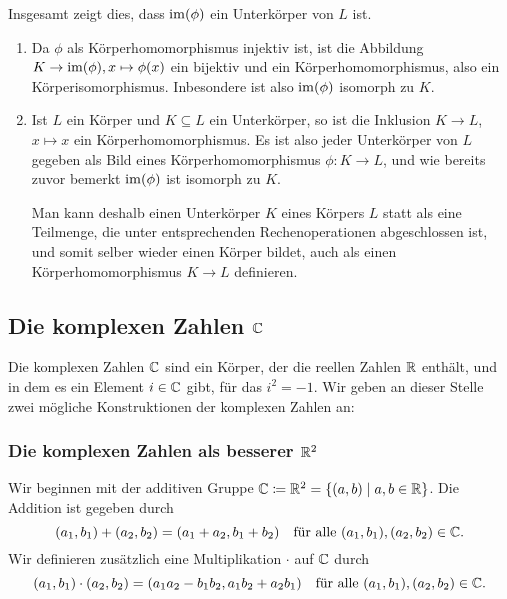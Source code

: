 Insgesamt zeigt dies, dass $\mathrm{im}(\phi)$ ein Unterkörper von $L$ ist.

\begin{bem}
 \begin{enumerate}[leftmargin=*]
  \item
   Da $\phi$ als Körperhomomorphismus injektiv ist, ist die Abbildung $K \to \mathrm{im}(\phi), x \mapsto \phi(x)$ ein bijektiv und ein Körperhomomorphismus, also ein Körperisomorphismus. Inbesondere ist also $\mathrm{im}(\phi)$ isomorph zu $K$.
  \item
   Ist $L$ ein Körper und $K \subseteq L$ ein Unterkörper, so ist die Inklusion $K \to L$, $x \mapsto x$ ein Körperhomomorphismus. Es ist also jeder Unterkörper von $L$ gegeben als Bild eines Körperhomomorphismus $\phi \colon K \to L$, und wie bereits zuvor bemerkt $\mathrm{im}(\phi)$ ist isomorph zu $K$.
   
   Man kann deshalb einen Unterkörper $K$ eines Körpers $L$ statt als eine Teilmenge, die unter entsprechenden Rechenoperationen abgeschlossen ist, und somit selber wieder einen Körper bildet, auch als einen Körperhomomorphismus $K \to L$ definieren.
 \end{enumerate}
\end{bem}





\subsection{Die komplexen Zahlen \texorpdfstring{$\mathbb{C}$}{C}}
Die komplexen Zahlen $\mathbb{C}$ sind ein Körper, der die reellen Zahlen $\mathbb{R}$ enthält, und in dem es ein Element $i \in \mathbb{C}$ gibt, für das $i^2 = -1$. Wir geben an dieser Stelle zwei mögliche Konstruktionen der komplexen Zahlen an:



\subsubsection{Die komplexen Zahlen als besserer \texorpdfstring{$\mathbb{R}^2$}{R2}}
Wir beginnen mit der additiven Gruppe $\mathbb{C} \coloneqq \mathbb{R}^2 = \{(a,b) \mid a,b \in \mathbb{R}\}$. Die Addition ist gegeben durch
\[
 (a_1, b_1) + (a_2, b_2) = (a_1 + a_2, b_1 + b_2)
 \quad\text{für alle $(a_1, b_1), (a_2, b_2) \in \mathbb{C}$}.
\]
Wir definieren zusätzlich eine Multiplikation $\cdot$ auf $\mathbb{C}$ durch
\[
 (a_1, b_1) \cdot (a_2, b_2)
 = (a_1 a_2 - b_1 b_2, a_1 b_2 + a_2 b_1)
 \quad\text{für alle $(a_1, b_1), (a_2, b_2) \in \mathbb{C}$}.
\]

